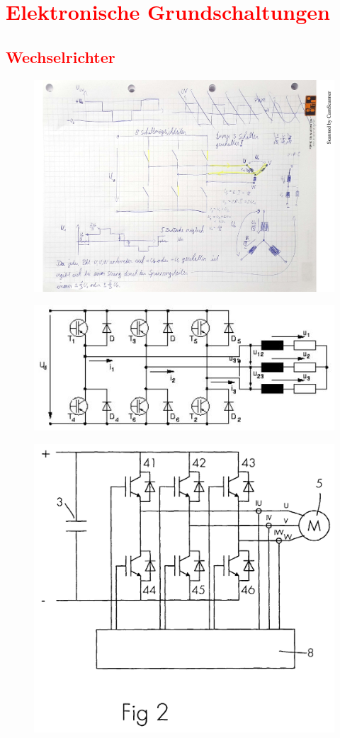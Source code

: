 	\section{\textcolor{red}{Elektronische Grundschaltungen}}
		\subsection{\textcolor{red}{Wechselrichter}}
			\begin{figure}[h]
				\centering
				\includegraphics[width=1\linewidth]{./pics/el/wechsel.pdf}
				\caption{}
				\label{}
			\end{figure}
			\begin{figure}[h]
				\centering
				\includegraphics[width=0.5\linewidth]{./pics/el/wechsel1}
				\caption{}
				\label{}
			\end{figure}
			\begin{figure}[h]
				\centering
				\includegraphics[width=0.5\linewidth]{./pics/el/wechsel2}
				\caption{}
				\label{}
			\end{figure}
			\leavevmode \\
